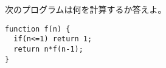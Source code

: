 \begin{Prob}\upshape
次のプログラムは何を計算するか答えよ。
\begin{Verbatim}
function f(n) {
  if(n<=1) return 1;
  return n*f(n-1);
}
\end{Verbatim}
\end{Prob}
